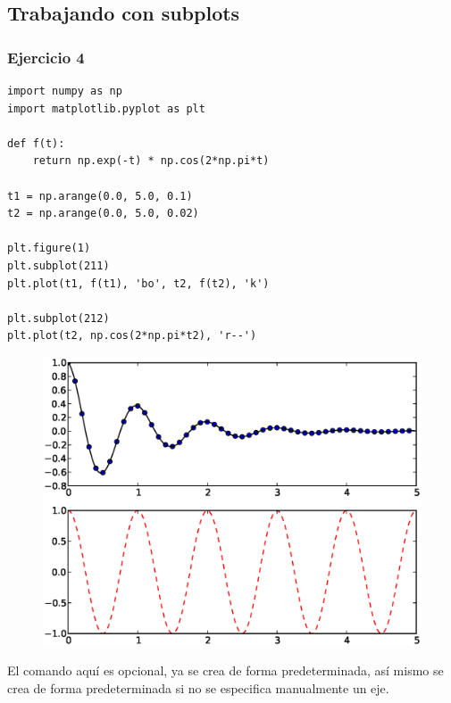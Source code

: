 \subsection{Trabajando con subplots}
\begin{frame}
\frametitle{Ejercicio 4}
\begin{lstlisting}[caption=Trabajando con múltiples gráficas,basicstyle=\linespread{1.2}\ttfamily\small, columns=fullflexible]
import numpy as np
import matplotlib.pyplot as plt

def f(t):
    return np.exp(-t) * np.cos(2*np.pi*t)

t1 = np.arange(0.0, 5.0, 0.1)
t2 = np.arange(0.0, 5.0, 0.02)

plt.figure(1)
plt.subplot(211)
plt.plot(t1, f(t1), 'bo', t2, f(t2), 'k')

plt.subplot(212)
plt.plot(t2, np.cos(2*np.pi*t2), 'r--')
\end{lstlisting}
\end{frame}
\begin{frame}[fragile]
\begin{figure}
	\centering
	\includegraphics[scale=0.5]{Imagenes/plotEjercicio4.eps}
\end{figure}
\end{frame}
\begin{frame}
El comando  aquí es opcional, ya  se crea de forma predeterminada, así mismo  se crea de forma predeterminada si no se especifica manualmente un eje.
\end{frame}
